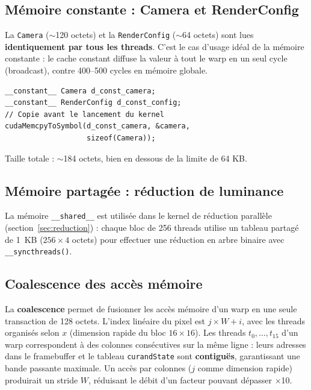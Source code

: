 \documentclass[12pt,a4paper]{article}
\begin{document}
\subsection{Mémoire constante : Camera et RenderConfig}

La \texttt{Camera} ($\sim$120 octets) et la \texttt{RenderConfig} ($\sim$64 octets) sont lues \textbf{identiquement par tous les threads}. C'est le cas d'usage idéal de la mémoire constante : le cache constant diffuse la valeur à tout le warp en un seul cycle (broadcast), contre 400--500 cycles en mémoire globale.

\begin{lstlisting}[caption={Utilisation de la mémoire constante}]
__constant__ Camera d_const_camera;
__constant__ RenderConfig d_const_config;
// Copie avant le lancement du kernel
cudaMemcpyToSymbol(d_const_camera, &camera,
                   sizeof(Camera));
\end{lstlisting}

Taille totale : $\sim$184 octets, bien en dessous de la limite de 64 KB.

\subsection{Mémoire partagée : réduction de luminance}

La mémoire \texttt{\_\_shared\_\_} est utilisée dans le kernel de réduction parallèle (section~\ref{sec:reduction}) : chaque bloc de 256 threads utilise un tableau partagé de 1~KB ($256 \times 4$ octets) pour effectuer une réduction en arbre binaire avec \texttt{\_\_syncthreads()}.

\subsection{Coalescence des accès mémoire}

La \textbf{coalescence} permet de fusionner les accès mémoire d'un warp en une seule transaction de 128 octets. L'index linéaire du pixel est $j \times W + i$, avec les threads organisés selon $x$ (dimension rapide du bloc $16\times16$). Les threads $t_0, \ldots, t_{15}$ d'un warp correspondent à des colonnes consécutives sur la même ligne : leurs adresses dans le framebuffer et le tableau \texttt{curandState} sont \textbf{contiguës}, garantissant une bande passante maximale. Un accès par colonnes ($j$ comme dimension rapide) produirait un stride $W$, réduisant le débit d'un facteur pouvant dépasser $\times$10.
\end{document}
